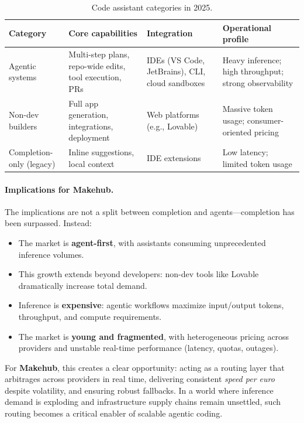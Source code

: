 \documentclass[english]{article}
\begin{document}
\begin{table}[H]
\centering
\caption{Code assistant categories in 2025.}
\label{tab:assistant_taxonomy}
\begin{tabular}{|p{3.2cm}|p{5cm}|p{3.8cm}|p{3.2cm}|}
\hline
\textbf{Category} & \textbf{Core capabilities} & \textbf{Integration} & \textbf{Operational profile} \\
\hline
Agentic systems & Multi-step plans, repo-wide edits, tool execution, PRs & IDEs (VS Code, JetBrains), CLI, cloud sandboxes & Heavy inference; high throughput; strong observability \\
\hline
Non-dev builders & Full app generation, integrations, deployment & Web platforms (e.g., Lovable) & Massive token usage; consumer-oriented pricing \\
\hline
Completion-only (legacy) & Inline suggestions, local context & IDE extensions & Low latency; limited token usage \\
\hline
\end{tabular}
\end{table}

\paragraph{Implications for Makehub.}
The implications are not a split between completion and agents—completion has been surpassed. 
Instead:
\begin{itemize}
  \item The market is \textbf{agent-first}, with assistants consuming unprecedented inference volumes.
  \item This growth extends beyond developers: non-dev tools like Lovable dramatically increase total demand.
  \item Inference is \textbf{expensive}: agentic workflows maximize input/output tokens, throughput, and compute requirements.
  \item The market is \textbf{young and fragmented}, with heterogeneous pricing across providers and unstable real-time performance (latency, quotas, outages).
\end{itemize}
For \textbf{Makehub}, this creates a clear opportunity: acting as a routing layer that arbitrages across providers in real time, delivering consistent \textit{speed per euro} despite volatility, and ensuring robust fallbacks. In a world where inference demand is exploding and infrastructure supply chains remain unsettled, such routing becomes a critical enabler of scalable agentic coding.
\end{document}

